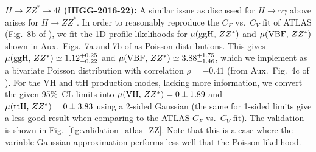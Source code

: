 
{\bf\boldmath $H\to ZZ^*\to 4l$ (HIGG-2016-22):} A similar issue as discussed for $H\to\gamma\gamma$ above arises 
for $H\to ZZ^*$. In order to reasonably reproduce the $C_F$ vs.\ $C_V$ fit of ATLAS (Fig.~8b of \cite{Aaboud:2017vzb}),  
we fit the 1D profile likelihoods for $\mu({\rm ggH},\,ZZ^*)$ and $\mu({\rm VBF},\,ZZ^*)$ shown in Aux.\ Figs.~7a and 7b 
of \cite{Aaboud:2017vzb} as Poisson distributions. This gives $\mu({\rm ggH},\,ZZ^*)\simeq 1.12^{+0.25}_{-0.22}$ and 
$\mu({\rm VBF},\,ZZ^*)\simeq 3.88^{+1.75}_{-1.46}$, which we implement as a bivariate Poisson distribution with    
correlation $\rho=-0.41$ (from Aux.\ Fig.~4c of \cite{Aaboud:2017vzb}). 
For the VH and ttH production modes, lacking more information, we convert the given 95\%~CL limits into 
$\mu({\rm VH},\,ZZ^*)=0\pm 1.89$ and $\mu({\rm ttH},\,ZZ^*)=0\pm 3.83$ using a 2-sided Gaussian 
(the same for 1-sided limits give a less good result when comparing to the ATLAS $C_F$ vs.\ $C_V$ fit). 
The validation is shown in Fig.~\ref{fig:validation_atlas_ZZ}. 
Note that this is a case where the variable Gaussian approximation performs less well that the Poisson likelihood. 

